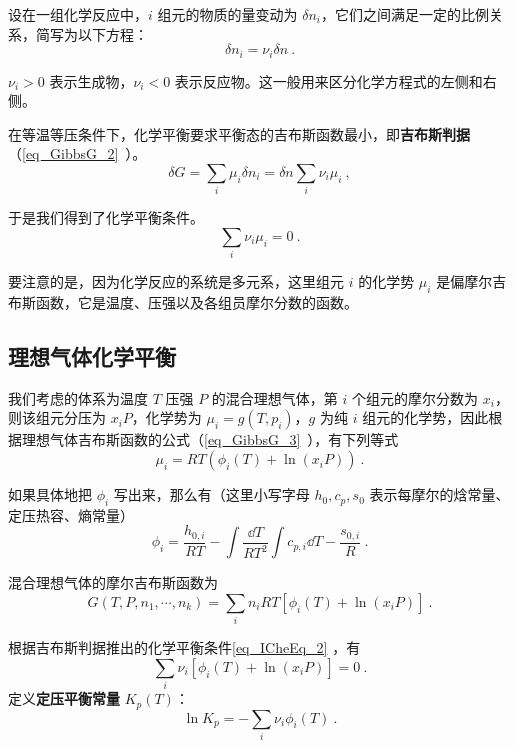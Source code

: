 

设在一组化学反应中，$i$ 组元的物质的量变动为 $\delta n_i$，它们之间满足一定的比例关系，简写为以下方程：
\begin{equation}
\delta n_i=\nu_i \delta n~.
\end{equation}

$\nu_i>0$ 表示生成物，$\nu_i<0$ 表示反应物。这一般用来区分化学方程式的左侧和右侧。

在等温等压条件下，化学平衡要求平衡态的吉布斯函数最小，即\textbf{吉布斯判据}（\autoref{eq_GibbsG_2}~）。
\begin{equation}
\delta G=\sum_i \mu_i\delta n_i=\delta n\sum_i \nu_i\mu_i~,
\end{equation}

于是我们得到了化学平衡条件。
\begin{equation}\label{eq_ICheEq_2}
\sum_i\nu_i\mu_i=0~.
\end{equation}

要注意的是，因为化学反应的系统是多元系，这里组元 $i$ 的化学势 $\mu_i$ 是偏摩尔吉布斯函数，它是温度、压强以及各组员摩尔分数的函数。

\subsection{理想气体化学平衡}

我们考虑的体系为温度 $T$ 压强 $P$ 的混合理想气体，第 $i$ 个组元的摩尔分数为 $x_i$，则该组元分压为 $x_iP$，化学势为 $\mu_i=g(T,p_i)$，$g$ 为纯 $i$ 组元的化学势，因此根据理想气体吉布斯函数的公式（\autoref{eq_GibbsG_3}~），有下列等式
\begin{equation}\label{eq_ICheEq_1}
\mu_i=RT(\phi_i(T)+\ln(x_iP))~.
\end{equation}

如果具体地把 $\phi_i$ 写出来，那么有（这里小写字母 $h_0,c_p,s_0$ 表示每摩尔的焓常量、定压热容、熵常量）
\begin{equation}
\phi_i=\frac{h_{0,i}}{RT}-\int\frac{\dd T}{RT^2}\int c_{p,i}\dd T-\frac{s_{0,i}}{R}~.
\end{equation}

混合理想气体的摩尔吉布斯函数为
\begin{equation}
G(T,P,n_1,\cdots,n_k)=\sum_i n_iRT[\phi_i(T)+\ln(x_iP)]~.
\end{equation}

根据吉布斯判据推出的化学平衡条件\autoref{eq_ICheEq_2} ，有
\begin{equation}\label{eq_ICheEq_3}
\sum_i\nu_i[\phi_i(T)+\ln (x_iP)]=0~.
\end{equation}
定义\textbf{定压平衡常量} $K_p(T)$：
\begin{equation}\label{eq_ICheEq_5}
\ln K_p=-\sum_i\nu_i\phi_i(T)~.
\end{equation}

